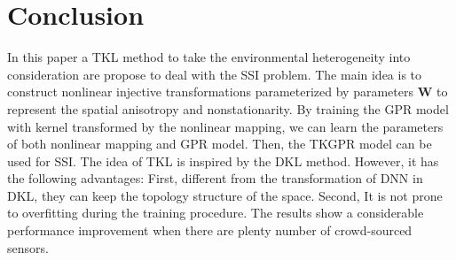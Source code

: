\documentclass[journal, oneside, twocolumn]{IEEEtran}
\begin{document}
\section{Conclusion}
In this paper a TKL method to take the environmental heterogeneity into consideration are propose to deal with the SSI problem. The main idea is to construct nonlinear injective transformations parameterized by parameters $\mathbf{W}$ to represent the spatial anisotropy and nonstationarity. By training the GPR model with kernel transformed by the nonlinear mapping, we can learn the parameters of both nonlinear mapping and GPR model. Then, the TKGPR model can be used for SSI. The idea of TKL is inspired by the DKL method. However, it has the following advantages: First, different from the transformation of DNN in DKL, they can keep the topology structure of the space.  Second, It is not prone to overfitting during the training procedure. The results show a considerable performance improvement when there are plenty number of crowd-sourced sensors.

\ifCLASSOPTIONcaptionsoff
  \newpage
\fi






\end{document}
